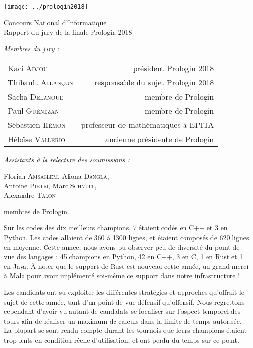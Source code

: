\documentclass[a4paper,12pt,notitle,noheader,nofooter]{prologin}
\begin{document}
\begin{titlepage}
\begin{center}
\texttt{[image: ../prologin2018]}

\vspace{2.4cm}
{
 \Huge \textsf{Concours National d'Informatique}\\
 \vspace{1em}
 \Large Rapport du jury de la finale Prologin 2018
 \vspace{0.5cm}
}
\end{center}
\textit{Membres du jury :}
\begin{center}
\begin{tabular}{l r}
Kaci \textsc{Adjou} & président Prologin 2018 \\
Thibault \textsc{Allançon} & responsable du sujet Prologin 2018 \\
Sacha \textsc{Delanoue} & membre de Prologin \\
Paul \textsc{Guénézan} & membre de Prologin \\
Sébastien \textsc{Hémon} & professeur de mathématiques à EPITA \\
Héloïse \textsc{Vallerio} & ancienne présidente de Prologin
\end{tabular}
\end{center}
\textit{Assistants à la relecture des soumissions :}
\begin{center}
Florian \textsc{Amsallem}, Aliona \textsc{Dangla}, \\
Antoine \textsc{Pietri}, Marc \textsc{Schmitt}, \\
Alexandre \textsc{Talon}

\end{center}
\quad membres de Prologin.
\end{titlepage}


Sur les codes des dix meilleurs champions, 7 étaient codés en C++ et 3 en
Python. Les codes allaient de 360 à 1300 lignes, et étaient composés de 620
lignes en moyenne. Cette année, nous avons pu observer peu de diversité du point
de vue des langages : 45 champions en Python, 42 en C++, 3 en C, 1 en Rust et 1
en Java. À noter que le support de Rust est nouveau cette année, un grand merci
à Malo pour avoir implémenté soi-même ce support dans notre infrastructure !

\bigbreak

Les candidats ont su exploiter les différentes stratégies et approches
qu'offrait le sujet de cette année, tant d'un point de vue défensif qu'offensif.
Nous regrettons cependant d'avoir vu autant de candidats se focaliser sur
l'aspect temporel des tours afin de réaliser un maximum de calculs dans la
limite de temps autorisée. La plupart se sont rendu compte durant les tournois
que leurs champions étaient trop lents en condition réelle d'utilisation, et ont
perdu du temps sur ce point.
\end{document}
